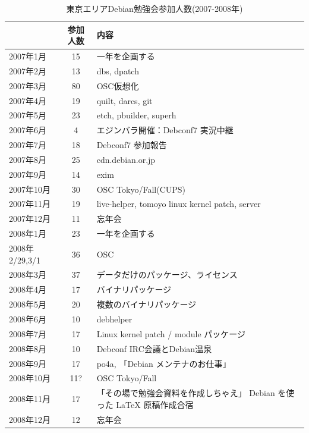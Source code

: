 \documentclass[mingoth,a4paper]{jsarticle}
\begin{document}
\begin{table}[ht]
\begin{minipage}{0.5\hsize}
 \caption{東京エリアDebian勉強会参加人数(2007-2008年)}\label{tab:count2007}
 \begin{center}
  \begin{tabular}{|l|c|p{10em}|}
 \hline
 & 参加人数 & 内容\\
 \hline
   2007年1月 & 15 & 一年を企画する \\
   2007年2月 & 13 & dbs, dpatch\\ 
   2007年3月 & 80 & OSC仮想化 \\
   2007年4月 & 19 & quilt, darcs, git\\
   2007年5月 & 23 & etch, pbuilder, superh \\   
   2007年6月 & 4 & エジンバラ開催：Debconf7 実況中継 \\
   2007年7月 & 18 & Debconf7 参加報告\\
   2007年8月 & 25 & cdn.debian.or.jp \\   
   2007年9月 & 14 & exim \\   
   2007年10月 & 30 & OSC Tokyo/Fall(CUPS) \\   
   2007年11月 & 19 & live-helper, tomoyo linux kernel patch, server\\
   2007年12月 & 11 & 忘年会\\
   2008年1月 & 23 & 一年を企画する \\
   2008年2/29,3/1 & 36 & OSC  \\
   2008年3月 & 37 & データだけのパッケージ、ライセンス \\
   2008年4月 & 17 & バイナリパッケージ \\
   2008年5月 & 20 & 複数のバイナリパッケージ \\
   2008年6月 & 10 & debhelper \\
   2008年7月 & 17 & Linux kernel patch / module パッケージ \\
   2008年8月 & 10 & Debconf IRC会議とDebian温泉 \\
   2008年9月 & 17 & po4a, 「Debian メンテナのお仕事」 \\
   2008年10月 & 11? & OSC Tokyo/Fall \\
   2008年11月 & 17 & 「その場で勉強会資料を作成しちゃえ」 Debian を使った \LaTeX{} 原稿作成合宿 \\
   2008年12月 & 12 & 忘年会 \\
 \hline
  \end{tabular}
 \end{center}
\end{minipage}
\end{table}
\end{document}
